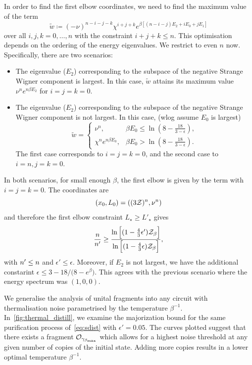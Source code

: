 \documentclass[pra,
aps,
twocolumn,
superscriptaddress,
groupedaddress,
nofootinbib,
reprint
]{revtex4-1}
\begin{document}
In order to find the first elbow coordinates, we need to find the maximum value of the term
\begin{equation}
	\tilde{w} \coloneqq (-\nu)^{n-i-j-k} \chi^{i+j+k} e^{\beta [(n-i-j)E_2 + iE_0 + jE_1]}
\end{equation}
over all $i,j,k = 0,\dots,n$ with the constraint $i+j+k \leq n$.
This optimisation depends on the ordering of the energy eigenvalues.
We restrict to even $n$ now.
Specifically, there are two scenarios:
\begin{itemize}
	\item The eigenvalue ($E_2$) corresponding to the subspace of the negative Strange Wigner component is largest.
	In this case, $\tilde{w}$ attains its maximum value $\nu^n e^{n\beta E_2}$ for $i=j=k=0$.
	\item The eigenvalue ($E_2$) corresponding to the subspace of the negative Strange Wigner component is not largest.
	In this case, (wlog assume $E_0$ is largest)
	\begin{equation}
	  \tilde{w} =
     \begin{cases}
		\nu^n, &\beta E_0 \leq \ln{\left(8-\frac{18}{3-\epsilon}\right)}, \\
		\chi^n e^{n\beta E_0}, &\beta E_0 > \ln{\left(8-\frac{18}{3-\epsilon}\right)}.
	  \end{cases}
	\end{equation}
	The first case corresponds to $i=j=k=0$, and the second case to $i=n,j=k=0$.
\end{itemize}
In both scenarios, for small enough $\beta$, the first elbow is given by the term with $i=j=k=0$.
The coordinates are
\begin{equation}
	(x_0, L_0) = ((3\mathcal{Z})^n, \nu^n)
\end{equation}
and therefore the first elbow constraint $L_\star \geq L'_\star$ gives
\begin{align}
	\frac{n}{n'} \geq \frac{\ln{\Big[ (1-\frac{4}{3}\epsilon')\mathcal{Z}_\beta \Big]}}{\ln{\Big[ (1-\frac{4}{3}\epsilon)\mathcal{Z}_\beta \Big]}},
\end{align}
with $n' \leq n$ and $\epsilon' \leq \epsilon$. 
Moreover, if $E_2$ is not largest, we have the additional constarint $\epsilon \leq 3 - 18/\big(8-e^{\beta}\big)$.
This agrees with the previous scenario where the energy spectrum was $(1,0,0)$.



\null\newpage
\null\newpage

We generalise the analysis of unital fragments into any circuit with thermalisation noise parametrised by the temperature $\beta^{-1}$.
In~\cref{fig:thermal_distill}, we examine the majorization bound for the same purification process of~\cref{eq:sdist} with $\epsilon' = 0.05$.
The curves plotted suggest that there exists a fragment $\mathcal{O}_{\gamma_{\beta_{\rm{max}}}}$ which allows for a highest noise threshold at any given number of copies of the initial state.
Adding more copies results in a lower optimal temperature $\beta^{-1}$.
\end{document}
